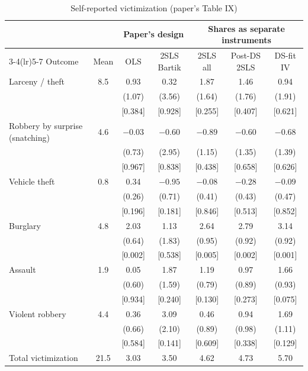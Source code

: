 \documentclass[11pt]{article}
\begin{document}
\begin{table}[htbp]
\centering
\small
\begin{threeparttable}
\caption{Self-reported victimization (paper's Table IX)}
\label{tab:victim}
\begin{tabular}{lcccccc}
\toprule
 & & \multicolumn{2}{c}{Paper's design} & \multicolumn{3}{c}{Shares as separate instruments}\\
\cmidrule(lr){3-4}\cmidrule(lr){5-7}
Outcome & Mean & OLS & 2SLS Bartik & 2SLS all & Post-DS 2SLS & DS-fit IV \\
\midrule
Larceny / theft & 8.5 & 0.93 & 0.32 & 1.87 & 1.46 & 0.94 \\
 & & (1.07) & (3.56) & (1.64) & (1.76) & (1.91) \\
 & & [0.384] & [0.928] & [0.255] & [0.407] & [0.621] \\
\addlinespace
Robbery by surprise (snatching) & 4.6 & $-0.03$ & $-0.60$ & $-0.89$ & $-0.60$ & $-0.68$ \\
 & & (0.73) & (2.95) & (1.15) & (1.35) & (1.39) \\
 & & [0.967] & [0.838] & [0.438] & [0.658] & [0.626] \\
\addlinespace
Vehicle theft & 0.8 & 0.34 & $-0.95$ & $-0.08$ & $-0.28$ & $-0.09$ \\
 & & (0.26) & (0.71) & (0.41) & (0.43) & (0.47) \\
 & & [0.196] & [0.181] & [0.846] & [0.513] & [0.852] \\
\addlinespace
Burglary & 4.8 & 2.03 & 1.13 & 2.64 & 2.79 & 3.14 \\
 & & (0.64) & (1.83) & (0.95) & (0.92) & (0.92) \\
 & & [0.002] & [0.538] & [0.005] & [0.002] & [0.001] \\
\addlinespace
Assault & 1.9 & 0.05 & 1.87 & 1.19 & 0.97 & 1.66 \\
 & & (0.60) & (1.59) & (0.79) & (0.89) & (0.93) \\
 & & [0.934] & [0.240] & [0.130] & [0.273] & [0.075] \\
\addlinespace
Violent robbery & 4.4 & 0.36 & 3.09 & 0.46 & 0.94 & 1.69 \\
 & & (0.66) & (2.10) & (0.89) & (0.98) & (1.11) \\
 & & [0.584] & [0.141] & [0.609] & [0.338] & [0.129] \\
\addlinespace
Total victimization & 21.5 & 3.03 & 3.50 & 4.62 & 4.73 & 5.70 \\

\end{tabular}
\end{threeparttable}
\end{table}
\end{document}
